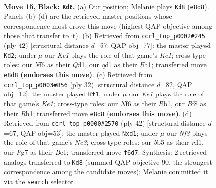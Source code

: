 \documentclass[11pt]{article}
\begin{document}
\clearpage

\begin{figure}[p]\centering
\begin{subfigure}{0.46\textwidth}\centering
\resizebox{\linewidth}{!}{%
\newchessgame
\chessboard[
  setfen={rnq1kb1r/p4pp1/5n1p/1BP2p1P/p2P1P2/8/6P1/R1BQK1NR b KQkq - 0 15},
  showmover=false,
  pgfstyle=straightmove, color=movearrow, markmove={e8-d8}
]}
\caption{}
\end{subfigure}\hfill
\begin{subfigure}{0.46\textwidth}\centering
\resizebox{\linewidth}{!}{%
\newchessgame
\chessboard[
  setfen={2q1k2r/5ppp/p2p4/3Np3/R2PP1bb/5P2/1rN3PP/3QKB1R w k - 3 22},
  showmover=false,
  pgfstyle=straightmove, color=movearrow, markmove={e1-d2}
]}
\caption{}
\end{subfigure}
\\[4pt]
\begin{subfigure}{0.46\textwidth}\centering
\resizebox{\linewidth}{!}{%
\newchessgame
\chessboard[
  setfen={r1bqk3/1p3p1Q/p1n5/3p3P/2p5/4PN2/Pb1PBPr1/1R2K2R w Kq - 0 17},
  showmover=false,
  pgfstyle=straightmove, color=movearrow, markmove={e1-f1}
]}
\caption{}
\end{subfigure}\hfill
\begin{subfigure}{0.46\textwidth}\centering
\resizebox{\linewidth}{!}{%
\newchessgame
\chessboard[
  setfen={1r4k1/5pp1/p1b1p3/q6p/Pb6/1PN1QP2/2P3PP/1K1rB2R w - - 0 22},
  showmover=false,
  pgfstyle=straightmove, color=movearrow, markmove={c3-d1}
]}
\caption{}
\end{subfigure}
\caption{\textbf{Move 15, Black: \texttt{Kd8}.} (a) Our position; Melanie plays \texttt{Kd8} (\texttt{e8d8}). Panels (b)--(d) are the retrieved master positions whose correspondence most drove this move (highest QAP objective among those that transfer to it). (b) Retrieved from \texttt{ccrl\_top\_p0002\#245} (ply 42) [structural distance $d$=57, QAP obj=77]: the master played \texttt{Kd2}; under $\mu$ our \emph{Ke1} plays the role of that game's \emph{Ke1}; cross-type roles: our \emph{N}f6 as their \emph{Q}d1, our \emph{q}d1 as their \emph{R}h1; transferred move \texttt{e8d8} \textbf{(endorses this move)}. (c) Retrieved from \texttt{ccrl\_top\_p0003\#856} (ply 32) [structural distance $d$=82, QAP obj=12]: the master played \texttt{Kf1}; under $\mu$ our \emph{Ke1} plays the role of that game's \emph{Ke1}; cross-type roles: our \emph{N}f6 as their \emph{R}b1, our \emph{B}f8 as their \emph{R}h1; transferred move \texttt{e8d8} \textbf{(endorses this move)}. (d) Retrieved from \texttt{ccrl\_top\_p0000\#2570} (ply 42) [structural distance $d$=67, QAP obj=53]: the master played \texttt{Nxd1}; under $\mu$ our \emph{Nf3} plays the role of that game's \emph{Nc3}; cross-type roles: our \emph{b}b5 as their \emph{r}d1, our \emph{P}g7 as their \emph{B}e1; transferred move \texttt{f6d7}. Synthesis: 2 retrieved analogs transferred to \texttt{Kd8} (summed QAP objective 90, the strongest correspondence among the candidate moves); Melanie committed it via the \texttt{search} selector.}
\label{fig:thought-m29}
\end{figure}
\end{document}
